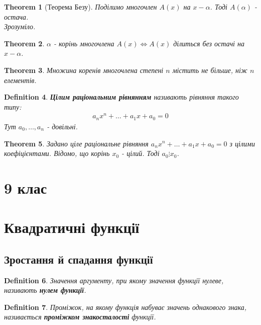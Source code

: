 \documentclass[a4paper, 10pt]{article}
\theoremstyle{theoremdd}
\newtheorem{theorem}{Theorem}[subsection]
\theoremstyle{theoremdd}
\newtheorem{definition}[theorem]{Definition}
\theoremstyle{theoremdd}
\theoremstyle{theoremdd}
\theoremstyle{theoremdd}
\theoremstyle{theoremdd}
\theoremstyle{theoremdd}
\theoremstyle{theoremdd}
\begin{document}
\begin{theorem}[Теорема Безу]
Поділимо многочлен $A(x)$ на $x-\alpha$. Тоді $A(\alpha)$ - остача.\\
\textit{Зрозуміло.}
\end{theorem}

\begin{theorem}
$\alpha$ - корінь многочлена $A(x) \iff A(x)$ ділиться без остачі на $x-\alpha$.
\end{theorem}

\begin{theorem}
Множина коренів многочлена степені $n$ містить не більше, ніж $n$ елементів.
\end{theorem}

\begin{definition}
\textbf{Цілим раціональним рівнянням} називають рівняння такого типу:
\begin{align*}
a_nx^n + \dots + a_1 x + a_0 = 0
\end{align*}
Тут $a_0,\dots,a_n$ - довільні.
\end{definition}

\begin{theorem}
Задано ціле раціональне рівняння $a_nx^n + \dots + a_1 x + a_0 = 0$ з цілими коефіцієнтами. Відомо, що корінь $x_0$ - цілий. Тоді $a_0 \vdots x_0$.
\end{theorem}
\newpage

\section*{9 клас}
\newpage

\section{Квадратичні функції}
\subsection{Зростання й спадання функції}
\begin{definition}
Значення аргументу, при якому значення функції нулеве, називають \textbf{нулем функції}.
\end{definition}

\begin{definition}
Проміжок, на якому функція набуває значень однакового знака, називається \textbf{проміжком знакосталості} функції.
\end{definition}
\end{document}
